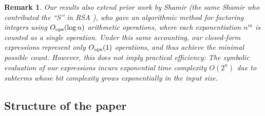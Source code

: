 \documentclass[10pt]{article}
\theoremstyle{plain}
\newtheorem{remark}{Remark}[section]
\begin{document}
\begin{remark}
Our results also extend prior work by Shamir \cite{shamir1979factoring} (the same Shamir who contributed the ``S'' in RSA \cite{rivest1978rsa}), who gave an algorithmic method for factoring integers using $O_{\textup{ops}}(\log n)$ arithmetic operations, where each exponentiation $n^m$ is counted as a single operation. Under this same accounting, our closed-form expressions represent only $O_{\textup{ops}}(1)$ operations, and thus achieve the minimal possible count. However, this does not imply practical efficiency: The symbolic evaluation of our expressions incurs exponential time complexity $O(2^n)$ due to subterms whose bit complexity grows exponentially in the input size.
\end{remark}

\subsection{Structure of the paper}
\end{document}
